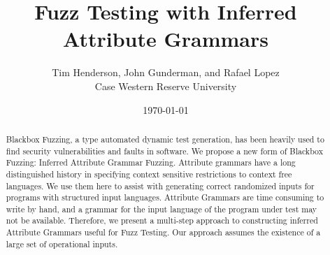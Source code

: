 \title{Fuzz Testing with Inferred Attribute Grammars}
\author{
        Tim Henderson, John Gunderman, and Rafael Lopez\\
        Case Western Reserve University\\
}
\date{\today}

\maketitle

\begin{abstract}
Blackbox Fuzzing, a type automated dynamic test generation, has been heavily
used to find security vulnerabilities and faults in software. We propose a new
form of Blackbox Fuzzing: Inferred Attribute Grammar Fuzzing. Attribute grammars
have a long distinguished history in specifying context sensitive restrictions to
context free languages. We use them here to assist with generating correct
randomized inputs for programs with structured input languages.  Attribute
Grammars are time consuming to write by hand, and a grammar for the input
language of the program under test may not be available. Therefore, we
present a multi-step approach to constructing inferred Attribute Grammars useful
for Fuzz Testing. Our approach assumes the existence of a large set of
operational inputs.
\end{abstract}
\vspace{.5in}










\appendix


